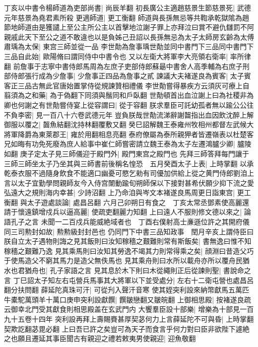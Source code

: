 丁亥以中書令楊師道為吏部尚書|{
	尚辰羊翻}
初長廣公主適趙慈景生節慈景死|{
	武德元年慈景為堯君素所殺}
更適師道|{
	更工衡翻}
師道與長孫無忌等共鞫承乾獄隂為趙節地師道由是獲譴上至公主所公主以首擊地泣謝子罪上亦拜泣曰賞不避仇讎罰不阿親戚此天下至公之道不敢違也以是負姊己丑詔以長孫無忌為太子太師房玄齡為太傅肅瑀為太保|{
	東宫三師並從一品}
李世勣為詹事瑀世勣並同中書門下三品同中書門下三品自此始|{
	歐陽脩曰謂同侍中中書令也}
又以左衛大將軍李大亮領右衛率|{
	率所律翻}
前詹事于志寧中書侍郎馬周為左庶子吏部侍郎蘇朂中書舍人高季輔為右庶子刑部侍郎張行成為少詹事|{
	少詹事正四品為詹事之貳}
諫議大夫褚遂良為賓客|{
	太子賓客正三品古無此官唐始置掌侍從規諫贊相禮儀}
李世勣嘗得暴疾方云須灰可療上自翦須為之和藥|{
	為于偽翻下同須與鬚同和戶臥翻}
世勣頓首出血泣謝上曰為社稷非為卿也何謝之有世勣嘗侍宴上從容謂曰|{
	從于容翻}
朕求羣臣可託幼孤者無以踰公公往不負李密|{
	見一百八十六卷武德元年}
豈負朕哉世勣流涕辭謝齧指出血因飲沈醉上解御服以覆之|{
	齧魚結翻沈持林翻覆敷又翻}
癸巳詔解魏王泰雍州牧相州都督左武候大將軍降爵為東萊郡王|{
	雍於用翻相息亮翻}
泰府僚屬為泰所親狎者皆遷嶺表以杜楚客兄如晦有功免死廢為庶人給事中崔仁師嘗密請立魏王泰為太子左遷鴻臚少卿|{
	臚陵如翻}
庚子定太子見三師儀迎于殿門外|{
	殿門東宫之殿門也}
先拜三師答拜每門讓于三師三師坐太子乃坐其與三師書前後稱名惶恐　五月癸酉太子上表|{
	上時掌翻}
以承乾泰衣服不過隨身飲食不能適口幽憂可愍乞勑有司優加供給上從之黄門侍郎劉洎上言以太子宜勤學問親師友今入侍宫闈動踰旬朔師保以下接對甚希伏願少抑下流之愛弘遠大之規則海内幸甚|{
	少詩沼翻}
上乃命洎與岑文本褚遂良馬周更日詣東宫|{
	更工衡翻}
與太子遊處談論|{
	處昌呂翻}
六月己卯朔日有食之　丁亥太常丞鄧素使高麗還請于懷遠鎮增戍兵以逼高麗|{
	使疏吏翻麗力知翻}
上曰遠人不服則修文德以來之|{
	論語孔子之言}
未聞一二百戍兵能威絶域者也　丁酉右僕射高士亷遜位許之其開府儀同三司勲封如故|{
	勲勲級封封邑也}
仍同門下中書三品知政事　閏月辛亥上謂侍臣曰朕自立太子遇物則誨之見其飯則曰汝知稼穡之艱難則常有斯飯矣|{
	書無逸曰惟不知稼穡之艱難乃逸}
見其乘馬則曰汝知其勞逸不竭其力則常得乘之矣|{
	顔淵曰昔造父巧于使馬造父不窮其馬力是造父無佚馬也}
見其乘舟則曰水所以載舟亦所以覆舟民猶水也君猶舟也|{
	孔子家語之言}
見其息於木下則曰木從繩則正后從諫則聖|{
	書說命之言}
丁巳詔太子知左右屯營兵馬事其大將軍以下並受處分|{
	左右十二衛屯營也處昌呂翻分扶問翻}
薛延陀真珠可汗|{
	可從刋入聲汗音寒}
使其姪突利設來納幣獻馬五萬匹牛橐駝萬頭羊十萬口庚申突利設獻饌|{
	饌皺戀翻又皺皖翻}
上御相思殿|{
	按褚遂良疏云御幸北門受其獻食則相思殿盖在玄武門内}
大饗羣臣設十部樂|{
	增樂為十部見一百九十五卷十四年}
突利設再拜上壽賜賚甚厚契苾何力上言薛延陀不可與昏|{
	上時掌翻契欺訖翻苾毘必翻}
上曰吾已許之矣豈可為天子而食言乎何力對曰臣非欲陛下遽絶之也願且遷延其事臣聞古有親迎之禮若敕夷男使親迎|{
	迎魚敬翻}
